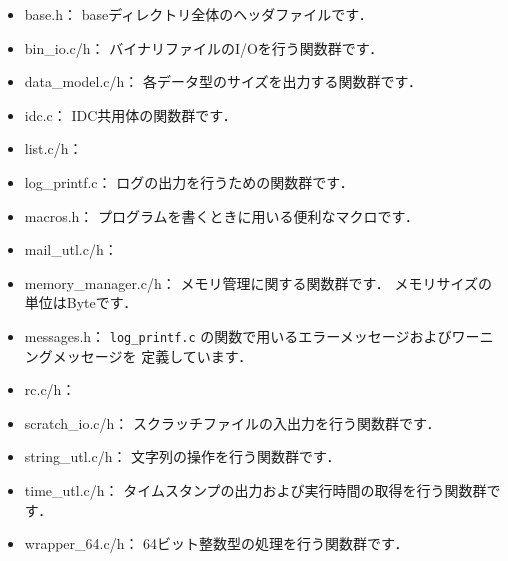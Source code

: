 \begin{itemize}

\item base.h：
baseディレクトリ全体のヘッダファイルです．

\item bin\_io.c/h：
バイナリファイルのI/Oを行う関数群です．

\item data\_model.c/h：
各データ型のサイズを出力する関数群です．

\item idc.c：
IDC共用体の関数群です．

\item list.c/h：

\item log\_printf.c：
ログの出力を行うための関数群です．

\item macros.h：
プログラムを書くときに用いる便利なマクロです．

\item mail\_utl.c/h：

\item memory\_manager.c/h：
メモリ管理に関する関数群です．
メモリサイズの単位はByteです．

\item messages.h：
\verb|log_printf.c| の関数で用いるエラーメッセージおよびワーニングメッセージを
定義しています．

\item rc.c/h：

\item scratch\_io.c/h：
スクラッチファイルの入出力を行う関数群です．

\item string\_utl.c/h：
文字列の操作を行う関数群です．

\item time\_utl.c/h：
タイムスタンプの出力および実行時間の取得を行う関数群です．

\item wrapper\_64.c/h：
64ビット整数型の処理を行う関数群です．

\end{itemize}


